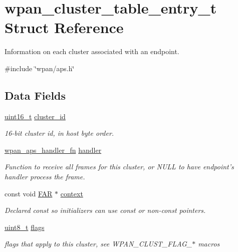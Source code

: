 \hypertarget{structwpan__cluster__table__entry__t}{\section{wpan\-\_\-cluster\-\_\-table\-\_\-entry\-\_\-t Struct Reference}
\label{structwpan__cluster__table__entry__t}
}


Information on each cluster associated with an endpoint.  




{\ttfamily \#include \char`\"{}wpan/aps.\-h\char`\"{}}

\subsection*{Data Fields}
\begin{DoxyCompactItemize}
\item 
\hyperlink{group__hal_ga5a8b2dc9e45a9ee81a94ef304fb62505}{uint16\-\_\-t} \hyperlink{group__wpan__aps_ga262a92f94287e77cb56350951893bae2}{cluster\-\_\-id}
\begin{DoxyCompactList}\small\item\em 16-\/bit cluster id, in host byte order. \end{DoxyCompactList}\item 
\hyperlink{group__wpan__aps_ga62b1036c0e296905f2d9a74e7e480297}{wpan\-\_\-aps\-\_\-handler\-\_\-fn} \hyperlink{group__wpan__aps_gab0c5e32241c4c2860c728aeab4b6f253}{handler}
\begin{DoxyCompactList}\small\item\em Function to receive all frames for this cluster, or N\-U\-L\-L to have endpoint's handler process the frame. \end{DoxyCompactList}\item 
const void \hyperlink{group__hal_gaef060b3456fdcc093a7210a762d5f2ed}{F\-A\-R} $\ast$ \hyperlink{group__wpan__aps_gad58378484a15ab673f5eb1613114330e}{context}
\begin{DoxyCompactList}\small\item\em Declared {\ttfamily const} so initializers can use {\ttfamily const} or non-\/{\ttfamily const} pointers. \end{DoxyCompactList}\item 
\hypertarget{group__wpan__aps_gaa2585d779da0ab21273a8d92de9a0ebe}{\hyperlink{group__hal_gae1affc9ca37cfb624959c866a73f83c2}{uint8\-\_\-t} \hyperlink{group__wpan__aps_gaa2585d779da0ab21273a8d92de9a0ebe}{flags}}\label{group__wpan__aps_gaa2585d779da0ab21273a8d92de9a0ebe}

\begin{DoxyCompactList}\small\item\em flags that apply to this cluster, see W\-P\-A\-N\-\_\-\-C\-L\-U\-S\-T\-\_\-\-F\-L\-A\-G\-\_\-$\ast$ macros \end{DoxyCompactList}\end{DoxyCompactItemize}


